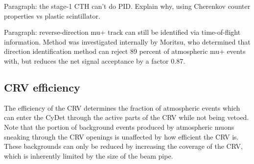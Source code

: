 Paragraph: the stage-1 CTH can't do PID. Explain why, using Cherenkov counter
properties vs plastic scintillator.

Paragraph: reverse-direction mu+ track can still be identified via
time-of-flight information. Method was investigated internally by Moritsu, who
determined that direction identification method can reject 89 percent of
atmospheric mu+ events with, but reduces the net signal acceptance by a
factor 0.87.


\subsection{CRV efficiency}
The efficiency of the CRV determines the fraction of atmospheric events which
can enter the CyDet through the active parts of the CRV while not being vetoed.
Note that the portion of background events produced by atmospheric muons
sneaking through the CRV openings is unaffected by how efficient the CRV is.
These backgrounds can only be reduced by increasing the coverage of the CRV,
which is inherently limited by the size of the beam pipe.



